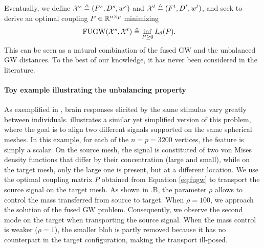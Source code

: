 Eventually, we define $\mathcal X^s \triangleq (F^s, D^s, w^s)$ and $\mathcal X^t \triangleq (F^t, D^t, w^t)$,
and seek to derive an optimal coupling $P \in \mathbb R^{n \times p}$ minimizing
\begin{equation}
    \label{eq:fugw}
    \begin{split}
        \text{FUGW}(\mathcal X^s, \mathcal X^t)
        &\triangleq \inf_{P \geq 0} L_{\theta}(P).
    \end{split}
\end{equation}
This can be seen as a natural combination of the fused GW \citep{Vayer19b}
and the unbalanced GW \citep{Sejourne20} distances. To the best of our knowledge,
it has never been considered in the literature.


\paragraph{Toy example illustrating the unbalancing property}

As exemplified in , brain responses elicited by the same stimulus
vary greatly between individuals.
 illustrates a similar yet simplified version of this problem,
where the goal is to align two different signals  supported on the same spherical meshes.
In this example, for each of the $n=p=3200$ vertices, the feature is simply a scalar.
On the source mesh, the signal is constituted of two von Mises density functions that differ
by their concentration (large and small), while on the target mesh, only the large one is present,
but at a different location.
We use the optimal coupling matrix $P$ obtained from Equation \eqref{eq:fugw} to transport
the source signal on the target mesh.
As shown in .B, the parameter $\rho$ allows to control
the mass transferred from source to target.
When $\rho=100$, we approach the solution of the fused GW problem. Consequently,
we observe the second mode on the target when transporting the source signal.
When the mass control is weaker ($\rho=1$), the smaller blob is partly removed because
it has no counterpart in the target configuration, making the transport ill-posed.

